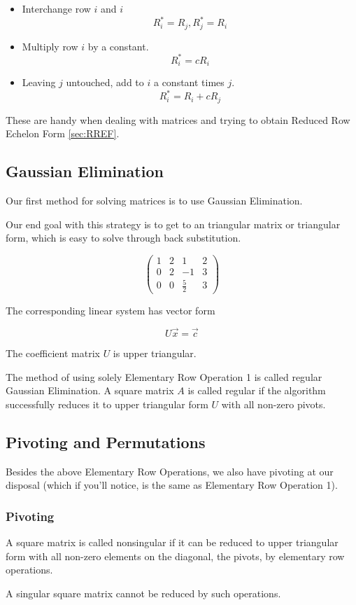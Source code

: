     \begin{itemize}
        \item Interchange row $i$ and $i$
            \[ R^*_i = R_j, R^*_j = R_i \]
        \item Multiply row $i$ by a constant.
            \[ R^*_i = cR_i \]
        \item Leaving $j$ untouched, add to $i$ a constant times $j$.
            \[ R^*_i = R_i + cR_j \]
    \end{itemize}

    These are handy when dealing with matrices and trying to obtain Reduced Row Echelon Form \eqref{sec:RREF}.

    \subsection{Gaussian Elimination}\label{sec:gaussianelimination}
    Our first method for solving matrices is to use Gaussian Elimination.

    Our end goal with this strategy is to get to an triangular matrix or triangular form, which is easy to solve through back substitution.

    \[ \left(\begin{array}{ccc|c}
            1 & 2 & 1 & 2\\
            0 & 2 & -1 & 3\\
            0 & 0 & \frac{5}{2} & 3
        \end{array}\right) \]

    The corresponding linear system has vector form

    \[ U\vec{x}=\vec{c} \]

    The coefficient matrix $U$ is upper triangular.

    The method of using solely Elementary Row Operation 1 is called regular Gaussian Elimination. A square matrix $A$ is called regular if the algorithm successfully reduces it to upper triangular form $U$ with all non-zero pivots.

    \subsection{Pivoting and Permutations}
    Besides the above Elementary Row Operations, we also have pivoting at our disposal (which if you'll notice, is the same as Elementary Row Operation 1).

        \subsubsection{Pivoting}
        \begin{definition}
            A square matrix is called nonsingular if it can be reduced to upper triangular form with all non-zero elements on the diagonal, the pivots, by elementary row operations.

            A singular square matrix cannot be reduced by such operations.
        \end{definition}

